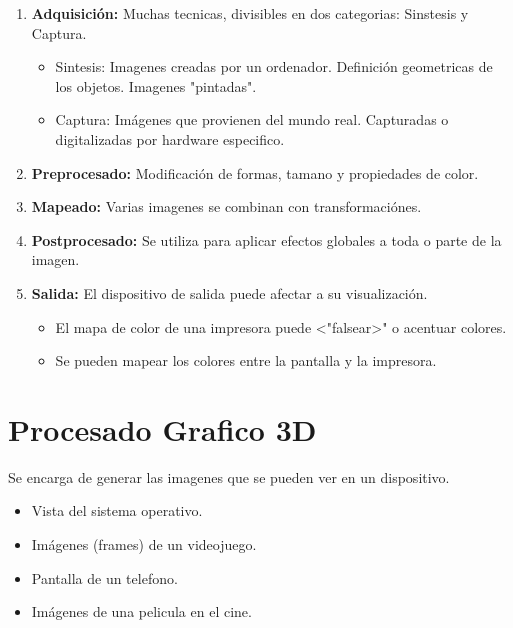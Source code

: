   \begin{enumerate}
      \item \textbf{Adquisición:} Muchas tecnicas, divisibles en dos categorias: Sinstesis y Captura.
      \begin{itemize}
        \item Sintesis: Imagenes creadas por un ordenador. Definición geometricas de los objetos. Imagenes "pintadas".
        \item Captura: Imágenes que provienen del mundo real. Capturadas o digitalizadas por hardware especifico.
      \end{itemize}
    \item \textbf{Preprocesado:} Modificación de formas, tamano y propiedades de color.
    \item \textbf{Mapeado:} Varias imagenes se combinan con transformaciónes.
    \item \textbf{Postprocesado:} Se utiliza para aplicar efectos globales a toda o parte de la imagen.
    \item \textbf{Salida:} El dispositivo de salida puede afectar a su visualización.
      \begin{itemize}
        \item El mapa de color de una impresora puede <"falsear>" o acentuar colores.
        \item Se pueden mapear los colores entre la pantalla y la impresora.
      \end{itemize}
  \end{enumerate}

  \section{Procesado Grafico 3D}
  Se encarga de generar las imagenes que se pueden ver en un dispositivo.
\begin{itemize}
  \item Vista del sistema operativo.
  \item Imágenes (frames) de un videojuego.
  \item Pantalla de un telefono.
  \item Imágenes  de una pelicula en el cine.
\end{itemize}
